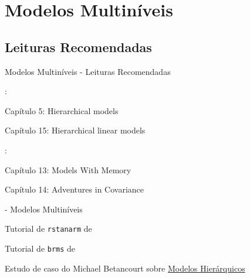 \section{Modelos Multiníveis}

\subsection{Leituras Recomendadas}
\begin{frame}{Modelos Multiníveis - Leituras Recomendadas}
	\begin{vfilleditems}
		\item \textcite{gelman2013bayesian}:
		\begin{vfilleditems}
			\item Capítulo 5: Hierarchical models
			\item Capítulo 15: Hierarchical linear models
		\end{vfilleditems}
		\item \textcite{mcelreath2020statistical}:
		\begin{vfilleditems}
			\item Capítulo 13: Models With Memory
			\item Capítulo 14: Adventures in Covariance
		\end{vfilleditems}
		\item \textcite{storopoli2021estatisticabayesianaR} - Modelos Multiníveis
		\item Tutorial de \texttt{rstanarm} de \textcite{muth2018user}
		\item Tutorial de \texttt{brms} de \textcite{burknerAdvancedBayesianMultilevel2018}
		\item \textcite{gelmanDataAnalysisUsing2007}
		\item Estudo de caso do Michael Betancourt sobre \href{https://betanalpha.github.io/assets/case_studies/hierarchical_modeling.html}{Modelos Hierárquicos}
		\item \textcite{kruschke2015bayesian}
	\end{vfilleditems}
\end{frame}

